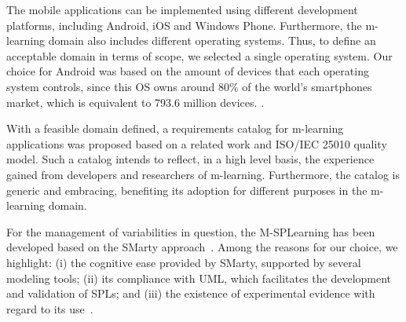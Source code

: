 The mobile applications can be implemented using different development platforms, including Android, iOS and Windows Phone. Furthermore, the m-learning domain also includes different operating systems. Thus, to define an acceptable domain in terms of scope, we selected a single operating system. Our choice for Android was based on the amount of devices that each operating system controls, since this OS owns around 80\% of the world's smartphones market, which is equivalent to 793.6 million devices. \cite{llamas14}.

With a feasible domain defined, a requirements catalog for m-learning applications was proposed based on a related work \cite{filho13} and ISO/IEC 25010 quality model. Such a catalog intends to reflect, in a high level basis, the experience gained from developers and researchers of m-learning. Furthermore, the catalog is generic and embracing, benefiting its adoption for different purposes in the m-learning domain. 

For the management of variabilities in question, the M-SPLearning has been developed based on the SMarty approach~\cite{oliveirajr10}. Among the reasons for our choice, we highlight: (i) the cognitive ease provided by SMarty, supported by several modeling tools; (ii) its compliance with UML, which facilitates the development and validation of SPLs; and (iii) the existence of experimental evidence with regard to its use~\cite{marcolino13, marcolino14a, marcolino14b, bera15}. 

